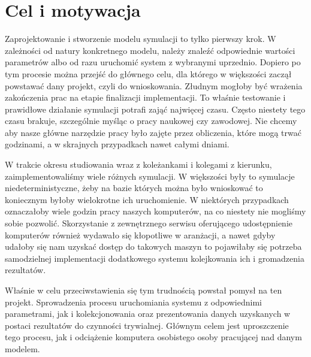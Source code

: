 \chapter{Cel i motywacja}
\label{cha:celIMotywacja}

\par Zaprojektowanie i stworzenie modelu symulacji to tylko pierwszy krok. W zależności od natury konkretnego modelu, należy znaleźć odpowiednie wartości parametrów albo od razu uruchomić system z wybranymi uprzednio. Dopiero po tym procesie można przejść do głównego celu, dla którego w większości zaczął powstawać dany projekt, czyli do wnioskowania. Złudnym mogłoby być wrażenia zakończenia prac na etapie finalizacji implementacji. To właśnie testowanie i prawidłowe działanie symulacji potrafi zająć najwięcej czasu. Często niestety tego czasu brakuje, szczególnie myśląc o pracy naukowej czy zawodowej. Nie chcemy aby nasze główne narzędzie pracy było zajęte przez obliczenia, które mogą trwać godzinami, a w skrajnych przypadkach nawet całymi dniami.

\par W trakcie okresu studiowania wraz z koleżankami i kolegami z kierunku, zaimplementowaliśmy wiele różnych symulacji. W większości były to symulacje niedeterministyczne, żeby na bazie których można było wnioskować to koniecznym byłoby wielokrotne ich uruchomienie. W niektórych przypadkach oznaczałoby wiele godzin pracy naszych komputerów, na co niestety nie mogliśmy sobie pozwolić. Skorzystanie z zewnętrznego serwisu oferującego udostępnienie komputerów również wydawało się kłopotliwe w aranżacji, a nawet gdyby udałoby się nam uzyskać dostęp do takowych maszyn to pojawiłaby się potrzeba samodzielnej implementacji dodatkowego systemu kolejkowania ich i gromadzenia rezultatów.

\par Właśnie w celu przeciwstawienia się tym trudnością powstał pomysł na ten projekt. Sprowadzenia procesu uruchomiania systemu z odpowiednimi parametrami, jak i kolekcjonowania oraz prezentowania danych uzyskanych w postaci rezultatów do czynności trywialnej. Głównym celem jest uproszczenie tego procesu, jak i odciążenie komputera osobistego osoby pracującej nad danym modelem.